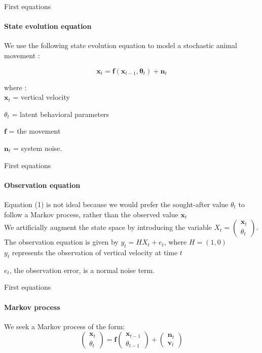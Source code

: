 \documentclass[dvipsnames, handout]{beamer}
\begin{document}
\begin{frame}{First equations}
\framesubtitle{State evolution equation}

We use the following state evolution equation to model a stochastic animal movement :

\begin{equation}
\mathbf{x}_t=\mathbf{f}(\mathbf{x}_{t-1},\mathbf{\theta}_t)+\mathbf{n}_t
\end{equation}

where :
\newline
\\

$\mathbf{x}_t$ = vertical velocity

$\theta_t$ = latent behavioral parameters

$\mathbf{f}$ = the movement

$\mathbf{n}_t$ = system noise.

\end{frame}


\begin{frame}{First equations}
\framesubtitle{Observation equation}
Equation (1) is not ideal because we would prefer the sought-after value $\theta_t$ to follow a Markov process, rather than the observed value $\mathbf{x}_t$
\newline
\\
We artificially augment the state space by introducing the variable $X_t = \begin{pmatrix}
\mathbf{x}_t\\\theta_t
\end{pmatrix}$.
\newline
\\
The observation equation is given by $y_t = HX_t + e_t$, where $H = (1, 0)$
\newline
\\
$y_t$ represents the observation of vertical velocity at time $t$

$e_t$, the observation error, is a normal noise term.

\end{frame}

\begin{frame}{First equations}
\framesubtitle{Markov process}

We seek a Markov process of the form:
\begin{equation}
\begin{pmatrix}
\mathbf{x}_t\\\theta_t
\end{pmatrix}
=
\mathbf{f}\begin{pmatrix}
\mathbf{x}_{t-1}\\\theta_{t-1}
\end{pmatrix}
+
\begin{pmatrix}
\mathbf{n}_t \\\mathbf{v}_t
\end{pmatrix}
\end{equation}

\end{frame}
\end{document}
